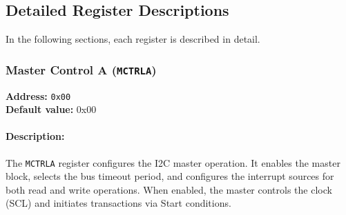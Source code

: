 \subsection{Detailed Register Descriptions}

In the following sections, each register is described in detail.

\subsubsection{Master Control A (\texttt{MCTRLA})}
\label{sec:mctrla}

\textbf{Address:} \texttt{0x00} \\
\textbf{Default value:} 0x00

\paragraph{Description:}  
The \texttt{MCTRLA} register configures the I2C master operation. It enables the master block, selects the bus
timeout period, and configures the interrupt sources for both read and write operations. When enabled, the master
controls the clock (SCL) and initiates transactions via Start conditions.

